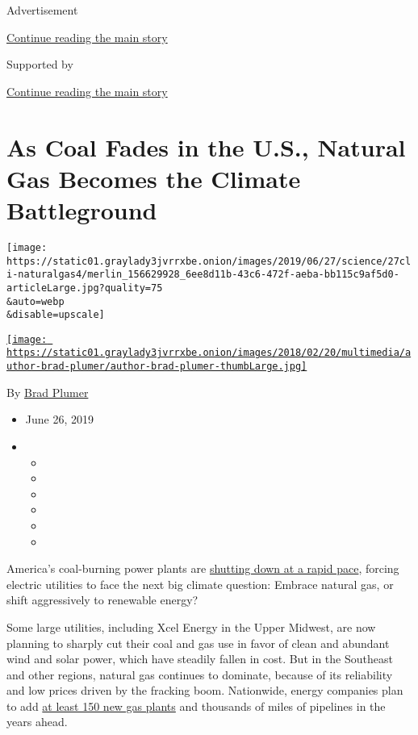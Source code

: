 Advertisement

\protect\hyperlink{after-top}{Continue reading the main story}

Supported by

\protect\hyperlink{after-sponsor}{Continue reading the main story}

\hypertarget{as-coal-fades-in-the-us-natural-gas-becomes-the-climate-battleground}{%
\section{As Coal Fades in the U.S., Natural Gas Becomes the Climate
Battleground}\label{as-coal-fades-in-the-us-natural-gas-becomes-the-climate-battleground}}

\texttt{[image: https://static01.graylady3jvrrxbe.onion/images/2019/06/27/science/27cli-naturalgas4/merlin\_156629928\_6ee8d11b-43c6-472f-aeba-bb115c9af5d0-articleLarge.jpg?quality=75\\\&auto=webp\\\&disable=upscale]}

\href{https://www.nytimes3xbfgragh.onion/by/brad-plumer}{\texttt{[image: https://static01.graylady3jvrrxbe.onion/images/2018/02/20/multimedia/author-brad-plumer/author-brad-plumer-thumbLarge.jpg]}}

By \href{https://www.nytimes3xbfgragh.onion/by/brad-plumer}{Brad Plumer}

\begin{itemize}
\item
  June 26, 2019
\item
  \begin{itemize}
  \item
  \item
  \item
  \item
  \item
  \item
  \end{itemize}
\end{itemize}

America's coal-burning power plants are
\href{https://www.nytimes3xbfgragh.onion/interactive/2018/06/13/climate/coal-nuclear-bailout.html?module=inline}{shutting
down at a rapid pace}, forcing electric utilities to face the next big
climate question: Embrace natural gas, or shift aggressively to
renewable energy?

Some large utilities, including Xcel Energy in the Upper Midwest, are
now planning to sharply cut their coal and gas use in favor of clean and
abundant wind and solar power, which have steadily fallen in cost. But
in the Southeast and other regions, natural gas continues to dominate,
because of its reliability and low prices driven by the fracking boom.
Nationwide, energy companies plan to add
\href{https://www.eia.gov/electricity/annual/pdf/epa.pdf}{at least 150
new gas plants} and thousands of miles of pipelines in the years ahead.

